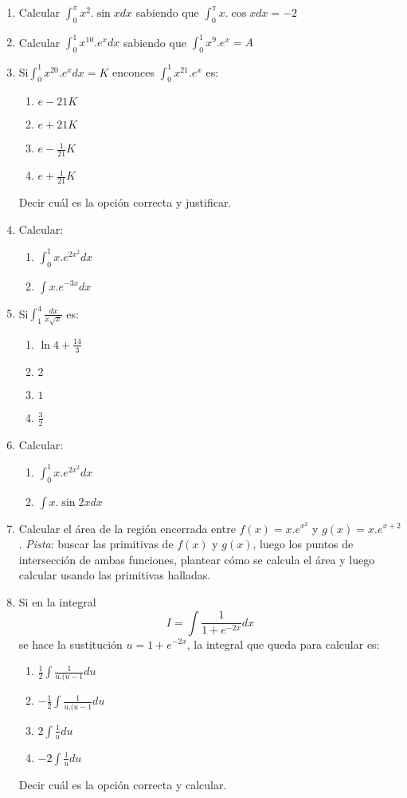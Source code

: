 \documentclass[12pt]{article}
\begin{document}
\begin{enumerate}
\item  
Calcular $\int_{0}^{\pi}x^2.\sin{x} dx$ sabiendo que $ \int_{0}^{\pi}x.\cos x dx = -2$

\item  
Calcular $\int_{0}^{1}x^{10}. e^x dx$ sabiendo que $ \int_{0}^{1}x^9. e^x  = A$

\item  
Si$ \int_{0}^{1}x^{20}. e^x dx =K$ enconces $ \int_{0}^{1}x^{21}. e^x$ es:
\begin{enumerate}
\item  $e - 21K$
\item  $e + 21K$
\item  $e - \frac{1}{21}K$
\item  $e + \frac{1}{21}K$
\end{enumerate}
Decir cuál es la opción correcta y justificar.

\item  
Calcular: 
\begin{enumerate}
\item $\int_{0}^{1}x. e^{2x^2} dx$ 
\item $\int x. e^{-3x} dx$ 
\end{enumerate}

\item  
Si$\int_{1}^{4} \frac{dx}{x\sqrt{x}}$ es:
\begin{enumerate}
\item  $\ln 4 + \frac{14}{3}$
\item  $2$
\item  $1$
\item  $\frac{3}{2}$
\end{enumerate}

\item  
Calcular: 
\begin{enumerate}
\item $\int_{0}^{1}x. e^{2x^2} dx$ 
\item $\int x. \sin{2x}dx$ 
\end{enumerate}
 
\item  
Calcular el área de la región encerrada entre $f(x) = x.e^{x^2}$ y $g(x) = x.e^{x+2}$. \textit{Pista}: buscar las primitivas de $f(x)$ y $g(x)$, luego los puntos de intersección de ambas funciones, plantear cómo se calcula el área y luego calcular usando las primitivas halladas.

\item  
Si en la integral
\begin{equation*}
I =\int \frac{1}{1+e^{-2x}}dx
\end{equation*} 
se hace la sustitución $u = 1+e^{-2x}$, la integral que queda para calcular es:
\begin{enumerate}
\item $\frac{1}{2}\int \frac{1}{u.(u-1}du$ 
\item $-\frac{1}{2}\int \frac{1}{u.(u-1}du$ 
\item $2\int \frac{1}{u}du$
\item $-2\int \frac{1}{u}du$
 \end{enumerate}
Decir cuál es la opción correcta y calcular.


\end{enumerate}
\end{document}
